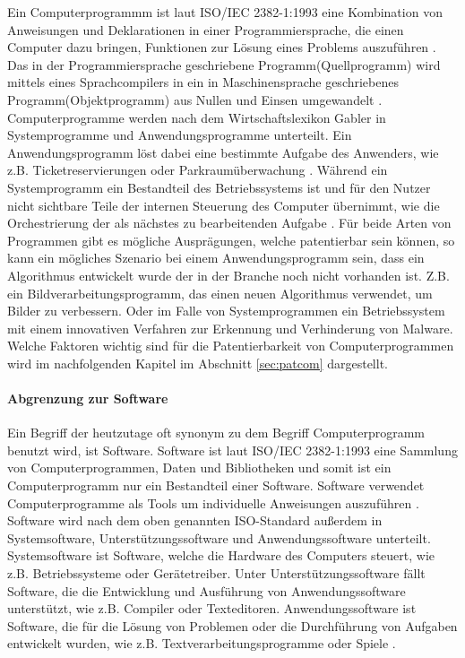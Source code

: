 Ein Computerprogrammm ist laut ISO/IEC 2382-1:1993 
eine Kombination von Anweisungen und Deklarationen in einer
Programmiersprache, die einen Computer dazu bringen, 
Funktionen zur Lösung eines Problems auszuführen 
\cite{instituteofelectricalandelectronicsengineersinc.ISO47652010}.
Das in der Programmiersprache geschriebene Programm(Quellprogramm) wird 
mittels eines Sprachcompilers in ein in Maschinensprache geschriebenes 
Programm(Objektprogramm) aus Nullen und Einsen umgewandelt \cite{WasIstProgramm}.
Computerprogramme werden nach dem Wirtschaftslexikon Gabler in Systemprogramme
und Anwendungsprogramme unterteilt. 
Ein Anwendungsprogramm löst dabei eine bestimmte Aufgabe des Anwenders, 
wie z.B. Ticketreservierungen oder Parkraumüberwachung 
\cite{lackesDefinitionAnwendungsprogramm}. 
Während ein Systemprogramm ein Bestandteil des Betriebssystems ist und 
für den Nutzer nicht sichtbare Teile der internen Steuerung des Computer übernimmt,
wie die Orchestrierung der als nächstes zu bearbeitenden Aufgabe \cite{lackesDefinitionSystemprogramm}.
Für beide Arten von Programmen gibt es mögliche Ausprägungen, 
welche patentierbar sein können, so kann ein mögliches Szenario bei einem Anwendungsprogramm sein,
dass ein Algorithmus entwickelt wurde der in der Branche noch nicht vorhanden ist. Z.B. ein
Bildverarbeitungsprogramm, das einen neuen Algorithmus verwendet, um Bilder zu verbessern.
Oder im Falle von Systemprogrammen ein Betriebssystem mit einem 
innovativen Verfahren zur Erkennung und Verhinderung von Malware.
Welche Faktoren wichtig sind für die Patentierbarkeit von Computerprogrammen wird im nachfolgenden 
Kapitel im Abschnitt \ref{sec:patcom} dargestellt.
\paragraph{Abgrenzung zur Software}
Ein Begriff der heutzutage oft synonym zu dem Begriff Computerprogramm benutzt wird,
ist Software. Software ist laut ISO/IEC 2382-1:1993 eine Sammlung von Computerprogrammen, 
Daten und Bibliotheken und somit ist ein Computerprogramm nur ein Bestandteil einer Software.
Software verwendet Computerprogramme als Tools um individuelle Anweisungen auszuführen 
\cite{ComputerProgrammeUnverzichtbareComputerprogramme}.
Software wird nach dem oben genannten ISO-Standard außerdem in 
Systemsoftware, Unterstützungssoftware und Anwendungssoftware unterteilt.
Systemsoftware ist Software, welche die Hardware des Computers steuert, 
wie z.B. Betriebssysteme oder Gerätetreiber. Unter Unterstützungssoftware 
fällt Software, die die Entwicklung und Ausführung von Anwendungssoftware
unterstützt, wie z.B. Compiler oder Texteditoren. Anwendungssoftware ist
Software, die für die Lösung von Problemen oder die Durchführung von Aufgaben
entwickelt wurden, wie z.B. Textverarbeitungsprogramme oder Spiele
\cite{instituteofelectricalandelectronicsengineersinc.ISO47652010}.



